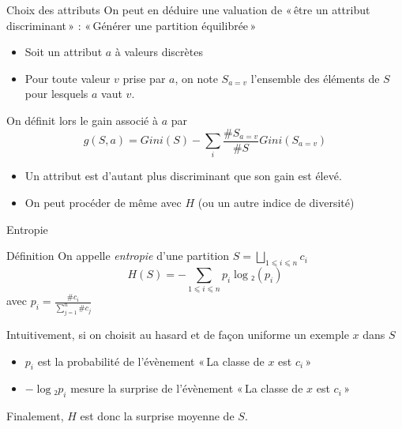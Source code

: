 \documentclass[../allslides.tex]{subfiles}
\begin{document}
\begin{frame}{Choix des attributs}
    On peut en déduire une valuation de « être un attribut discriminant » : « Générer une partition équilibrée »
    \begin{itemize}
         \item Soit un attribut \(a\) à valeurs discrètes
         \item Pour toute valeur \(v\) prise par \(a\), on note \(S_{a=v}\) l'ensemble des éléments de \(S\) pour lesquels \(a\) vaut \(v\).
    \end{itemize}
    On définit lors le gain associé à \(a\) par
    \begin{equation}
        g(S, a) = Gini(S) - ∑_i\frac{\#S_{a=v}}{\#S}Gini(S_{a=v})
    \end{equation}
    \begin{itemize}
        \item Un attribut est d'autant plus discriminant que son gain est élevé.
        \item On peut procéder de même avec \(H\) (ou un autre indice de diversité)
    \end{itemize}
\end{frame}

\begin{frame}{Entropie}
    \begin{block}{Définition}
        On appelle \emph{entropie} d'une partition \(S=⨆_{1⩽i⩽n}c_i\)
        \begin{equation}
            H(S) = -∑_{1⩽i⩽n}p_i\log₂(p_i)
        \end{equation}
        avec \(p_i=\frac{\#c_i}{∑_{j=1}^n\#c_j}\)
    \end{block}
    Intuitivement, si on choisit au hasard et de façon uniforme un exemple \(x\) dans \(S\)
    \begin{itemize}
        \item \(p_i\) est la probabilité de l'évènement « La classe de \(x\) est \(c_i\) »
        \item \(-\log₂p_i\) mesure la surprise de l'évènement « La classe de \(x\) est \(c_i\) »
    \end{itemize}
    Finalement, \(H\) est donc la surprise moyenne de \(S\).
\end{frame}
\end{document}
